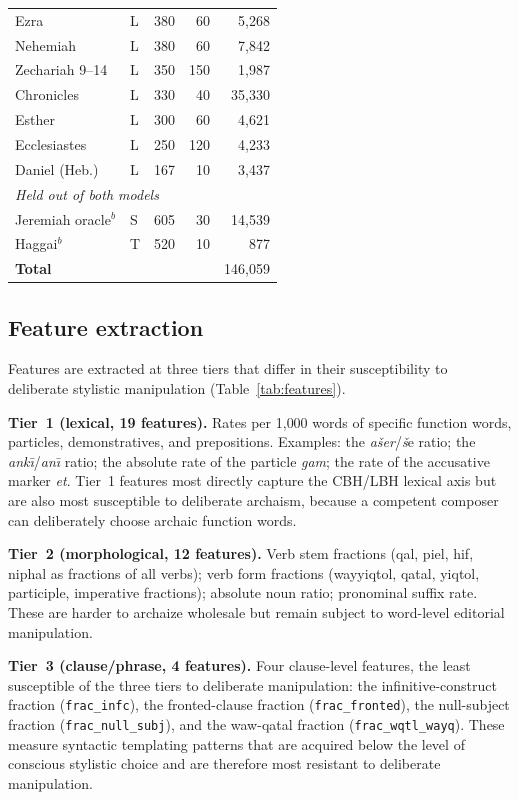 \documentclass[10pt,letterpaper]{article}
\newcommand{\cbh}{CBH}
\newcommand{\lbh}{LBH}
\begin{document}
\begin{table}[!ht]
\begin{tabular}{llrrr}
Ezra                  & L & 380 & 60 & 5{,}268 \\
Nehemiah              & L & 380 & 60 & 7{,}842 \\
Zechariah 9--14       & L & 350 & 150 & 1{,}987 \\
Chronicles            & L & 330 & 40 & 35{,}330 \\
Esther                & L & 300 & 60 & 4{,}621 \\
Ecclesiastes          & L & 250 & 120 & 4{,}233 \\
Daniel (Heb.)     & L & 167 & 10 & 3{,}437 \\
\hline
\multicolumn{5}{l}{\textit{Held out of both models}} \\
Jeremiah oracle$^b$   & S & 605 & 30 & 14{,}539 \\
Haggai$^b$            & T & 520 & 10 & 877 \\
\hline
\multicolumn{4}{l}{\textbf{Total}} & 146{,}059 \\
\hline
\end{tabular}
\label{tab:corpus}
\end{table}

\subsection*{Feature extraction}

Features are extracted at three tiers that differ in their susceptibility
to deliberate stylistic manipulation (Table~\ref{tab:features}).

\textbf{Tier~1 (lexical, 19 features).}  Rates per 1{,}000 words of
specific function words, particles, demonstratives, and prepositions.
Examples: the \textit{ašer}/\textit{š}e ratio; the \textit{ank\={\i}}/\textit{an\={\i}}
ratio; the absolute rate of the particle \textit{gam}; the rate of the
accusative marker \textit{et}.  Tier~1 features most directly capture the
\cbh{}/\lbh{} lexical axis but are also most susceptible to deliberate
archaism, because a competent composer can deliberately choose archaic
function words.

\textbf{Tier~2 (morphological, 12 features).}  Verb stem fractions
(qal, piel, hif, niphal as fractions of all verbs); verb form fractions
(wayyiqtol, qatal, yiqtol, participle, imperative fractions); absolute noun
ratio; pronominal suffix rate.  These are harder to archaize wholesale but
remain subject to word-level editorial manipulation.

\textbf{Tier~3 (clause/phrase, 4 features).}  Four clause-level features,
the least susceptible of the three tiers to deliberate manipulation: the
infinitive-construct fraction (\texttt{frac\_infc}),
the fronted-clause fraction (\texttt{frac\_fronted}), the null-subject
fraction (\texttt{frac\_null\_subj}), and the waw-qatal fraction
(\texttt{frac\_wqtl\_wayq}).  These measure syntactic templating patterns
that are acquired below the level of conscious stylistic choice and are
therefore most resistant to deliberate manipulation.
\end{document}
